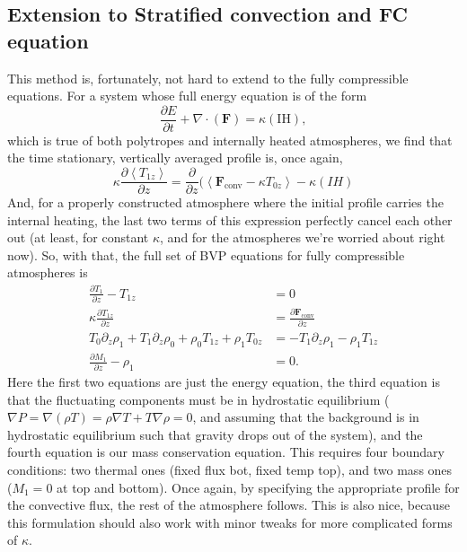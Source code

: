 \documentclass[aps, pre, onecolumn, nofootinbib, notitlepage, groupedaddress, amsfonts, amssymb, amsmath, longbibliography]{revtex4-1}
\newcommand{\Div}[1]{\ensuremath{\nabla\cdot\left( #1\right)}}
\newcommand{\angles}[1]{\ensuremath{\left\langle #1 \right\rangle}}
\newcommand{\grad}{\ensuremath{\nabla}}
\begin{document}
\begin{enumerate}
\section{Extension to Stratified convection and FC equation}
This method is, fortunately, not hard to extend to the fully compressible equations. For
a system whose full energy equation is of the form
$$
\frac{\partial E}{\partial t} + \Div{\bm{F}} = \kappa (\text{IH}),
$$
which is true of both polytropes and internally heated atmospheres, we find that the time
stationary, vertically averaged profile is, once again,
\begin{equation}
\kappa\frac{\partial \angles{T_{1z}}}{\partial z} = 
\frac{\partial}{\partial z}(\angles{\bm{F}_{\text{conv}} - \kappa T_{0z}} - \kappa (IH)
\end{equation}
And, for a properly constructed atmosphere where the initial profile carries the internal
heating, the last two terms of this expression perfectly cancel each other out (at least,
for constant $\kappa$, and for the atmospheres we're worried about right now).  So, with that,
the full set of BVP equations for fully compressible atmospheres is
\begin{equation}
\begin{split}
\frac{\partial T_1}{\partial z} - T_{1z} &= 0 \\
\kappa \frac{\partial T_{1z}}{\partial z} &= \frac{\partial \bm{F}_{\text{conv}}}{\partial z} \\
T_0 \partial_z \rho_1 + T_1 \partial_z \rho_0 + \rho_0 T_{1z} + \rho_1 T_{0z} &= - T_1 \partial_z \rho_1 - \rho_1 T_{1z} \\
\frac{\partial M_1}{\partial z} - \rho_1 &= 0.
\label{eqn:FC_BVP_eqns}
\end{split}
\end{equation}
Here the first two equations are just the energy equation, the third equation is that the
fluctuating components must be in hydrostatic equilibrium ($\grad P = \grad (\rho T) = 
\rho \grad T + T \grad \rho = 0$, and assuming that the background is in hydrostatic equilibrium
such that gravity drops out of the system), and the fourth equation is our mass conservation equation.
This requires four boundary conditions: two thermal ones (fixed flux bot, fixed temp top), and
two mass ones ($M_1 = 0$ at top and bottom).  Once again, by specifying the appropriate profile
for the convective flux, the rest of the atmosphere follows.  This is also nice, because this
formulation should also work with minor tweaks for more complicated forms of $\kappa$.




\end{enumerate}
\end{document}
